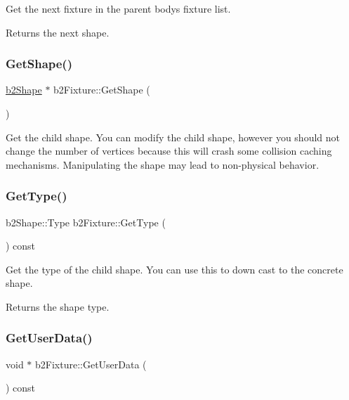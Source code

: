 Get the next fixture in the parent body\textquotesingle{}s fixture list. \begin{DoxyReturn}{Returns}
the next shape. 
\end{DoxyReturn}
\mbox{\label{classb2_fixture_aaa2b73fa212fa53b1c800cccd7a1d31e}} 
\subsubsection{\texorpdfstring{Get\+Shape()}{GetShape()}}
{\footnotesize\ttfamily \hyperlink{classb2_shape}{b2\+Shape} $\ast$ b2\+Fixture\+::\+Get\+Shape (\begin{DoxyParamCaption}{ }\end{DoxyParamCaption})\hspace{0.3cm}{\ttfamily [inline]}}

Get the child shape. You can modify the child shape, however you should not change the number of vertices because this will crash some collision caching mechanisms. Manipulating the shape may lead to non-\/physical behavior. \mbox{\label{classb2_fixture_a7a566c1e3b768f6a72ebc3b758aad70e}} 
\subsubsection{\texorpdfstring{Get\+Type()}{GetType()}}
{\footnotesize\ttfamily b2\+Shape\+::\+Type b2\+Fixture\+::\+Get\+Type (\begin{DoxyParamCaption}{ }\end{DoxyParamCaption}) const\hspace{0.3cm}{\ttfamily [inline]}}

Get the type of the child shape. You can use this to down cast to the concrete shape. \begin{DoxyReturn}{Returns}
the shape type. 
\end{DoxyReturn}
\mbox{\label{classb2_fixture_ae2a865ed59ffe9b1cb89f577052f4d50}} 
\subsubsection{\texorpdfstring{Get\+User\+Data()}{GetUserData()}}
{\footnotesize\ttfamily void $\ast$ b2\+Fixture\+::\+Get\+User\+Data (\begin{DoxyParamCaption}{ }\end{DoxyParamCaption}) const\hspace{0.3cm}{\ttfamily [inline]}}

